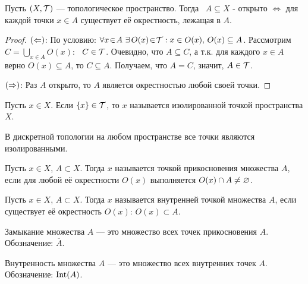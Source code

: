 \begin{statement}
    Пусть $(X, \mathcal{T})$ --- топологическое пространство. Тогда \ $A \subseteq X$ - открыто $\Leftrightarrow$ для каждой точки $x \in A$ существует её окрестность, лежащая в $A$.
\end{statement}
\begin{proof}
    
    $\left(\Leftarrow\right)$: По условию: $\forall x \! \in \! A \ \exists \, O(x) \! \in \! \mathcal{T}: x \in O(x), \, O(x) \subseteq A$. Рассмотрим $C = \bigcup_{x \in A} O(x)$: \ $C \in \mathcal{T}$. 
    Очевидно, что $A \subseteq C$, а т.к. для каждого $x \in A$ верно $O(x) \subseteq A$, то $C \subseteq A$. Получаем, что $A = C$, значит, $A \in \mathcal{T}$.

    $\left(\Rightarrow\right)$: Раз $A$ открыто, то $A$ является окрестностью любой своей точки.
\end{proof}

\begin{definition}
    Пусть $x \in X$. Если $\left\{x\right\} \in \mathcal{T}$, то $x$ называется изолированной точкой пространства $X$.
\end{definition}

\begin{nota_bene}
    В дискретной топологии на любом пространстве все точки являются изолированными.
\end{nota_bene}

\begin{definition}
    Пусть $x \in X$, $A \subset X$. Тогда $x$ называется точкой прикосновения множества $A$, если для любой её окрестности $O(x)$ выполняется $O(x) \cap A \neq \varnothing$. 
\end{definition}

\begin{definition}
    Пусть $x \in X$, $A \subset X$. Тогда $x$ называется внутренней точкой множества $A$, если существует её окрестность $O(x)$: $O(x) \subset A$.
\end{definition}

\begin{definition}[A1]
    Замыкание множества $A$ --- это множество всех точек прикосновения $A$.
    Обозначение: $\overline{A}$.
\end{definition}

\begin{definition}[B1]
    Внутренность множества $A$ --- это множество всех внутренних точек $A$.
    Обозначение: $\operatorname{Int}(A)$.
\end{definition}

